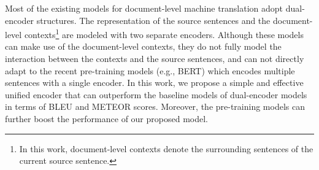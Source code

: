 Most of the existing models for document-level machine translation adopt dual-encoder structures. The representation of the source sentences and the document-level contexts\footnote{In this work, document-level contexts denote the surrounding sentences of the current source sentence.} are modeled with two separate encoders. Although these models can make use of the document-level contexts, they do not fully model the interaction between the contexts and the source sentences, and can not directly adapt to the recent pre-training models (e.g., BERT) which encodes multiple sentences with a single encoder. In this work, we propose a simple and effective unified encoder that can outperform the baseline models of dual-encoder models in terms of BLEU and METEOR scores. Moreover, the pre-training models can further boost the performance of our proposed model.
